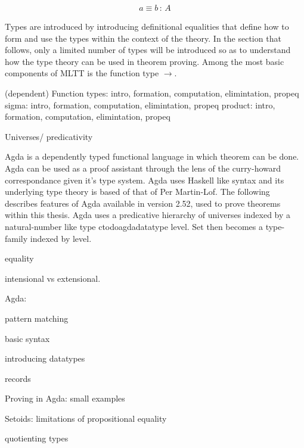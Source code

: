 \begin{align*}
    a \equiv b \, : \, A
\end{align*}



Types are introduced by introducing definitional equalities that define how to
form and use the types within the context of the theory. In the section that
follows, only a limited number of types will be introduced so as to understand
how the type theory can be used in theorem proving. Among the most basic
components of MLTT is the function type $\rightarrow$.

(dependent) Function types: intro, formation, computation, elimintation, propeq
sigma: intro, formation, computation, elimintation, propeq
product: intro, formation, computation, elimintation, propeq

Universes/ predicativity

Agda is a dependently typed functional language in which theorem can be done.
Agda can be used as a proof assistant through the lens of the curry-howard
correspondance given it's type system. Agda uses Haskell like syntax and its
underlying type theory is based of that of Per Martin-Lof. The following
describes features of Agda available in version 2.52, used to prove theorems
within this thesis. Agda uses a predicative hierarchy of universes indexed by a
natural-number like type ctodo{agdadatatype} level. Set then becomes a
type-family indexed by level. 

equality

intensional vs extensional.

Agda:

pattern matching

basic syntax

introducing datatypes

records



Proving in Agda: small examples

Setoids: limitations of propositional equality

quotienting types


